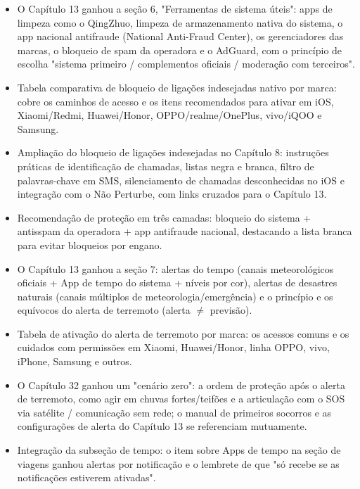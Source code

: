 
\begin{itemize}
  \item O Capítulo 13 ganhou a seção 6, "Ferramentas de sistema úteis": apps de limpeza como o QingZhuo, limpeza de armazenamento nativa do sistema, o app nacional antifraude (National Anti-Fraud Center), os gerenciadores das marcas, o bloqueio de spam da operadora e o AdGuard, com o princípio de escolha "sistema primeiro / complementos oficiais / moderação com terceiros".
  \item Tabela comparativa de bloqueio de ligações indesejadas nativo por marca: cobre os caminhos de acesso e os itens recomendados para ativar em iOS, Xiaomi/Redmi, Huawei/Honor, OPPO/realme/OnePlus, vivo/iQOO e Samsung.
  \item Ampliação do bloqueio de ligações indesejadas no Capítulo 8: instruções práticas de identificação de chamadas, listas negra e branca, filtro de palavras-chave em SMS, silenciamento de chamadas desconhecidas no iOS e integração com o Não Perturbe, com links cruzados para o Capítulo 13.
  \item Recomendação de proteção em três camadas: bloqueio do sistema + antisspam da operadora + app antifraude nacional, destacando a lista branca para evitar bloqueios por engano.
\end{itemize}


\begin{itemize}
  \item O Capítulo 13 ganhou a seção 7: alertas do tempo (canais meteorológicos oficiais + App de tempo do sistema + níveis por cor), alertas de desastres naturais (canais múltiplos de meteorologia/emergência) e o princípio e os equívocos do alerta de terremoto (alerta $\neq$ previsão).
  \item Tabela de ativação do alerta de terremoto por marca: os acessos comuns e os cuidados com permissões em Xiaomi, Huawei/Honor, linha OPPO, vivo, iPhone, Samsung e outros.
  \item O Capítulo 32 ganhou um "cenário zero": a ordem de proteção após o alerta de terremoto, como agir em chuvas fortes/teifões e a articulação com o SOS via satélite / comunicação sem rede; o manual de primeiros socorros e as configurações de alerta do Capítulo 13 se referenciam mutuamente.
  \item Integração da subseção de tempo: o item sobre Apps de tempo na seção de viagens ganhou alertas por notificação e o lembrete de que "só recebe se as notificações estiverem ativadas".
\end{itemize}

